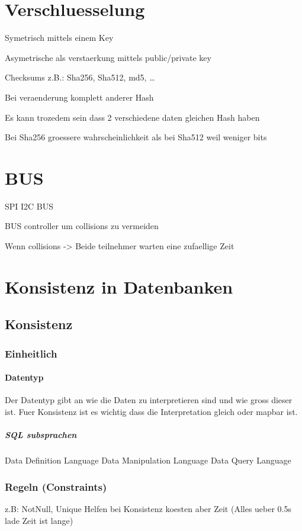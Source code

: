 \section{Verschluesselung}

Symetrisch mittels einem Key

Asymetrische als verstaerkung mittels public/private key

Checksums z.B.: Sha256, Sha512, md5, \ldots

Bei veraenderung komplett anderer Hash

Es kann trozedem sein dass 2 verschiedene daten gleichen Hash haben

Bei Sha256 groessere wahrscheinlichkeit als bei Sha512 weil weniger bits

\section{BUS}

SPI I2C BUS 

BUS controller um collisions zu vermeiden

Wenn collisions -> Beide teilnehmer warten eine zufaellige Zeit

\section{Konsistenz in Datenbanken}
\subsection{Konsistenz}
\subsubsection{Einheitlich}
\paragraph{Datentyp}
Der Datentyp gibt an wie die Daten zu interpretieren sind und wie gross dieser ist.
Fuer Konsistenz ist es wichtig dass die Interpretation gleich oder mapbar ist.

\subparagraph{SQL subsprachen}
Data Definition Language
Data Manipulation Language
Data Query Language

\subsubsection{Regeln (Constraints)}
z.B: NotNull, Unique
Helfen bei Konsistenz koesten aber Zeit (Alles ueber 0.5s lade Zeit ist lange)

